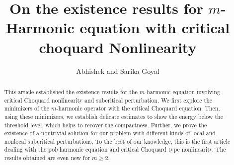 \documentclass[reqno]{amsart}
\title[ ]{On the existence results for $m$-Harmonic equation with  critical choquard Nonlinearity }
\author[Abhishek, Sarika Goyal ]
{Abhishek and Sarika Goyal }
\numberwithin{theorem}{section} \numberwithin{equation}{section}
\begin{document}
\maketitle
\begin{abstract}
This article established the existence results for the $m$-harmonic equation involving critical Choquard nonlinearity and subcritical perturbation.
We first explore the minimizers of the $m$-harmonic operator with the critical Choquard equation. Then, using these minimizers, we establish delicate estimates to show the energy below the threshold level, which helps to recover the compactness. Further, we prove the existence of a nontrivial solution for our problem with different kinds of local and nonlocal subcritical perturbations. To the best of our knowledge, this is the first article dealing with the polyharmonic equation and critical Choquard type nonlinearity. The results obtained are even new for $m\geq 2$.
\end{abstract}
\end{document}
